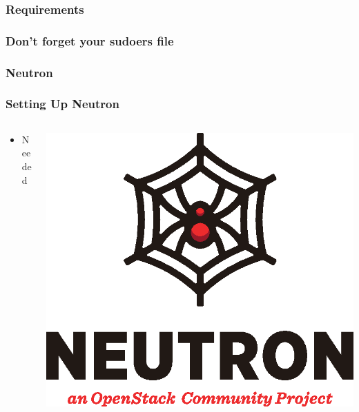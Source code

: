 \documentclass[aspectratio=169,11pt,hyperref={colorlinks=true}]{beamer}
\begin{document}
\begin{frame}
    \frametitle{Requirements}
    
\end{frame}

\begin{frame}
    \frametitle{Don't forget your sudoers file}
    
\end{frame}

\subsubsection{Neutron}
\begin{frame}
    \frametitle{Setting Up Neutron}
    \begin{columns}[T]
        \begin{column}{.48\textwidth}
            \begin{itemize}
                \item Needed
            \end{itemize}
        \end{column}
        \begin{column}{.48\textwidth}
            \includegraphics[width=\textwidth]{mascots/neutron.eps}
        \end{column}
    \end{columns}

\end{frame}
\end{document}
